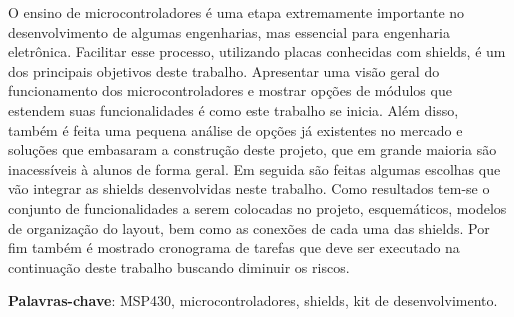 \begin{resumo}

O ensino de microcontroladores é uma etapa extremamente importante no desenvolvimento de algumas engenharias, mas essencial para engenharia eletrônica. Facilitar esse processo, utilizando placas conhecidas com shields, é um dos principais objetivos deste trabalho. Apresentar uma visão geral do funcionamento dos microcontroladores e mostrar opções de módulos que estendem suas funcionalidades é como este trabalho se inicia. Além disso, também é feita uma pequena análise de opções já existentes no mercado e soluções que embasaram a construção deste projeto, que em grande maioria são inacessíveis à alunos de forma geral. Em seguida são feitas algumas escolhas que vão integrar as shields desenvolvidas neste trabalho. Como resultados tem-se o conjunto de funcionalidades a serem colocadas no projeto, esquemáticos, modelos de organização do layout, bem como as conexões de cada uma das shields. Por fim também é mostrado cronograma de tarefas que deve ser executado na continuação deste trabalho buscando diminuir os riscos.

 \vspace{\onelineskip}
    
 \noindent
 \textbf{Palavras-chave}: MSP430, microcontroladores, shields, kit de desenvolvimento.
\end{resumo}
